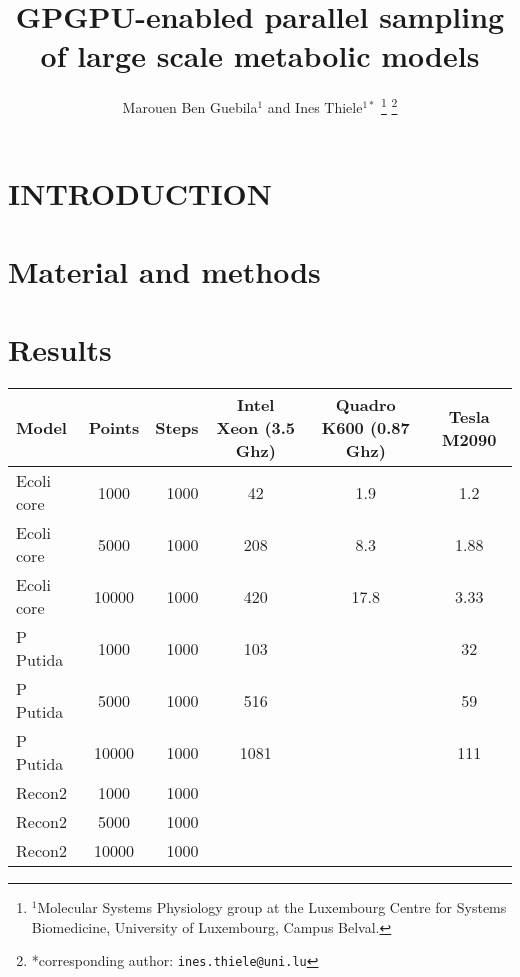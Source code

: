 \documentclass[letterpaper, 10 pt, conference]{ieeeconf}  %
\title{\LARGE \bf
GPGPU-enabled parallel sampling of large scale metabolic models
}
\author{Marouen Ben Guebila$^{1}$ and Ines Thiele$^{1*}$%
\thanks{$^{1}$Molecular Systems Physiology group at the Luxembourg Centre for Systems Biomedicine,
        University of Luxembourg, Campus Belval.
        }%
\thanks{*corresponding author: {\tt\small ines.thiele@uni.lu}}
}
\begin{document}
\maketitle
\thispagestyle{empty}
\pagestyle{empty}


\begin{abstract}



\end{abstract}


\section{INTRODUCTION}




\addtolength{\textheight}{-12cm}   %








\section{Material and methods}

\section{Results}
\begin{tabular}{|l|c|r|c|c|c|}
  \hline
  Model & Points & Steps & Intel Xeon (3.5 Ghz) & Quadro K600 (0.87 Ghz) & Tesla M2090 \\
  \hline
   Ecoli core& 1000& 1000& 42 & 1.9 & 1.2\\
   Ecoli core& 5000& 1000& 208 & 8.3 & 1.88\\
   Ecoli core& 10000& 1000& 420 & 17.8 & 3.33\\
   P Putida  & 1000& 1000& 103 & & 32\\
   P Putida  & 5000& 1000& 516 &  & 59\\
   P Putida  & 10000& 1000& 1081 & & 111\\
   Recon2  & 1000& 1000&  & & \\
   Recon2  & 5000& 1000&  & & \\
   Recon2  & 10000& 1000&  & & \\
  \hline
\end{tabular}
\end{document}

